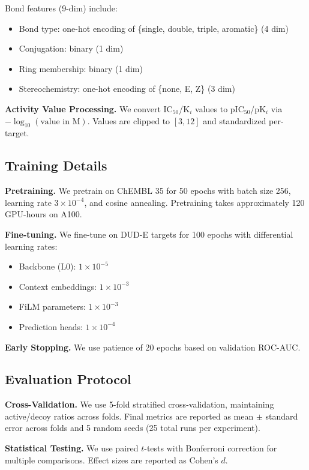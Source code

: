 \documentclass[sigconf,anonymous]{acmart}
\begin{document}
Bond features (9-dim) include:
\begin{itemize}[noitemsep]
    \item Bond type: one-hot encoding of \{single, double, triple, aromatic\} (4 dim)
    \item Conjugation: binary (1 dim)
    \item Ring membership: binary (1 dim)
    \item Stereochemistry: one-hot encoding of \{none, E, Z\} (3 dim)
\end{itemize}

\textbf{Activity Value Processing.} We convert IC$_{50}$/K$_i$ values to pIC$_{50}$/pK$_i$ via $-\log_{10}(\text{value in M})$. Values are clipped to $[3, 12]$ and standardized per-target.

\subsection{Training Details}

\textbf{Pretraining.} We pretrain on ChEMBL 35 for 50 epochs with batch size 256, learning rate $3 \times 10^{-4}$, and cosine annealing. Pretraining takes approximately 120 GPU-hours on A100.

\textbf{Fine-tuning.} We fine-tune on DUD-E targets for 100 epochs with differential learning rates:
\begin{itemize}[noitemsep]
    \item Backbone (L0): $1 \times 10^{-5}$
    \item Context embeddings: $1 \times 10^{-3}$
    \item FiLM parameters: $1 \times 10^{-3}$
    \item Prediction heads: $1 \times 10^{-4}$
\end{itemize}

\textbf{Early Stopping.} We use patience of 20 epochs based on validation ROC-AUC.

\subsection{Evaluation Protocol}

\textbf{Cross-Validation.} We use 5-fold stratified cross-validation, maintaining active/decoy ratios across folds. Final metrics are reported as mean $\pm$ standard error across folds and 5 random seeds (25 total runs per experiment).

\textbf{Statistical Testing.} We use paired $t$-tests with Bonferroni correction for multiple comparisons. Effect sizes are reported as Cohen's $d$.
\end{document}
